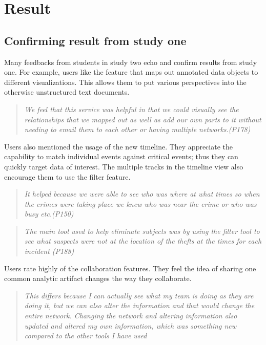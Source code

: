 \section{Result}

\subsection{Confirming result from study one}

Many feedbacks from students in study two echo and confirm results from study one. For example, users like the feature that maps out annotated data objects to different visualizations. This allows them to put various perspectives into the otherwise unstructured text documents.

\begin{quote}
\emph{We feel that this service was helpful in that we could visually see the relationships that we mapped out as well as add our own parts to it without needing to email them to each other or having multiple networks.(P178)}
\end{quote}

Users also mentioned the usage of the new timeline. They appreciate the capability to match individual events against critical events; thus they can quickly target data of interest. The multiple tracks in the timeline view also encourage them to use the filter feature. 

\begin{quote}
\emph{It helped because we were able to see who was where at what times so when the crimes were taking place we knew who was near the crime or who was busy etc.(P150)}
\end{quote}

\begin{quote}
\emph{The main tool used to help eliminate subjects was by using the filter tool to see what suspects were not at the location of the thefts at the times for each incident (P188)}
\end{quote}

Users rate highly of the collaboration features. They feel the idea of sharing one common analytic artifact changes the way they collaborate. 

\begin{quote}
\emph{This differs because I can actually see what my team is doing as they are doing it, but we can also alter the information and that would change the entire network. Changing the network and altering information also updated and altered my own information, which was something new compared to the other tools I have used}
\end{quote}

